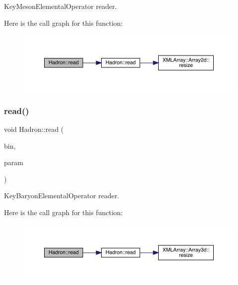 Key\+Meson\+Elemental\+Operator reader. 

Here is the call graph for this function\+:
\nopagebreak
\begin{figure}[H]
\begin{center}
\leavevmode
\includegraphics[width=350pt]{d1/daf/namespaceHadron_ae6acb258c409e20fdd2a36b3266138bc_cgraph}
\end{center}
\end{figure}
\mbox{\label{namespaceHadron_afb941d679afa3b1d65ca3048b28bc78c}} 
\subsubsection{\texorpdfstring{read()}{read()}\hspace{0.1cm}{\footnotesize\ttfamily [43/94]}}
{\footnotesize\ttfamily void Hadron\+::read (\begin{DoxyParamCaption}\item[{\mbox{\hyperlink{classADATIO_1_1BinaryReader}{Binary\+Reader}} \&}]{bin,  }\item[{\mbox{\hyperlink{structHadron_1_1KeyBaryonElementalOperator__t}{Key\+Baryon\+Elemental\+Operator\+\_\+t}} \&}]{param }\end{DoxyParamCaption})}



Key\+Baryon\+Elemental\+Operator reader. 

Here is the call graph for this function\+:
\nopagebreak
\begin{figure}[H]
\begin{center}
\leavevmode
\includegraphics[width=350pt]{d1/daf/namespaceHadron_afb941d679afa3b1d65ca3048b28bc78c_cgraph}
\end{center}
\end{figure}
\mbox{\label{namespaceHadron_a61a08fc66a0ee31593a2d5fff5657f7c}} 
